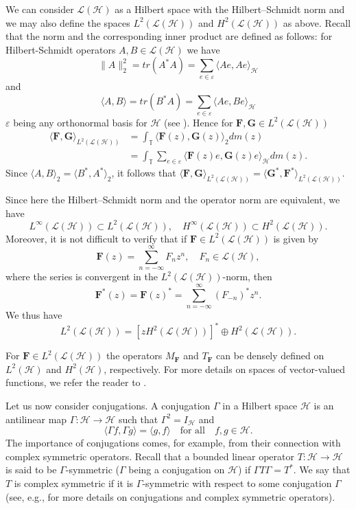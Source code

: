 \documentclass[12pt]{amsart}
\numberwithin{equation}{section}
\newcommand{\hsp}{\mathcal{H}}
\newcommand{\oL }{\mathcal{L}(\hsp) }
\newcommand{\F}{{\mathbf{F}}}
\newcommand{\G}{{\mathbf{G}}}
\theoremstyle{definition}
\numberwithin{equation}{section}
\begin{document}
We can consider $\oL $ as a Hilbert space with the Hilbert--Schmidt norm and we may also define the spaces $L^2(\oL)$ and $H^2(\oL)$ as above. Recall that the norm and the corresponding inner product are defined as follows: for Hilbert-Schmidt operators $A,B\in \oL$ we have
$$\|A\|^2_2=tr(A^*A)=\sum_{e\in \varepsilon} \langle Ae, Ae\rangle_{\hsp}$$ and
$$\langle A, B\rangle=tr(B^*A)=\sum_{e\in \varepsilon} \langle Ae, Be\rangle_{\hsp}$$
$\varepsilon$ being any orthonormal basis for $\hsp$ (see \cite[Chapter 3]{GMR}). Hence for $\F, \G \in L^2(\oL)$
\begin{align*}
\langle \F, \G\rangle_{L^{2}(\oL)}
&=\int_{\mathbb{T}}\langle \F(z), \G(z)\rangle_2 dm(z)\\
&=\int_{\mathbb{T}}\sum_{e\in \varepsilon}\langle \F(z)e, \G(z)e\rangle_\hsp dm(z).
\end{align*}
Since $\langle A,B\rangle_2=\langle B^*, A^*\rangle_2$, it follows that $\langle \F,\G\rangle_{L^2(\oL)}=\langle \G^*,\F^*\rangle_{L^2(\oL)}$.\par
Since here the Hilbert--Schmidt norm and the operator norm are equivalent, we have
$$L^{\infty}(\oL )\subset L^2(\oL ),\quad H^{\infty}(\oL )\subset H^2(\oL ).$$
Moreover, it is not difficult to verify that if $\F\in L^2(\oL)$ is given by
$$\F(z)=\sum_{n=-\infty}^{\infty}F_{n}z^n, \quad F_n\in \oL,$$
where the series is convergent in the $L^2(\oL)$-norm, then
$$\F^*(z)=\F(z)^*=\sum_{n=-\infty}^{\infty}(F_{-n})^{*}z^n.$$
We thus have
$$L^2(\oL)=\left[zH^2(\oL)\right]^*\oplus H^2(\oL).$$

For $\F\in L^2(\oL )$ the operators $M_{\F}$ and $T_{\F}$ can be densely defined on $L^{2}(\hsp )$ and $H^{2}(\hsp )$, respectively.
 For more details on spaces of vector-valued functions, we refer the reader to \cite{berc,NF,RR}.


Let us now consider conjugations. A conjugation $\Gamma$ in a Hilbert space
$\hsp$ is an antilinear map $\Gamma:\hsp\longrightarrow \hsp$ such that $\Gamma^2=I_\hsp$ and
$$\langle \Gamma f,\Gamma g\rangle=\langle g, f\rangle \quad \text{for all}\quad f,g\in \hsp. $$
The importance of
conjugations comes, for example, from their connection with complex
symmetric operators. Recall that a bounded linear operator $T:\hsp\longrightarrow\hsp$ is said to be $\Gamma$-symmetric ($\Gamma$ being a conjugation on $\hsp$) if $\Gamma T\Gamma=T^*$. We say that $T$ is complex symmetric if it is $\Gamma$-symmetric with respect
to some conjugation $\Gamma$ (see, e.g., \cite{GP} for more details on conjugations
and complex symmetric operators).
\end{document}
